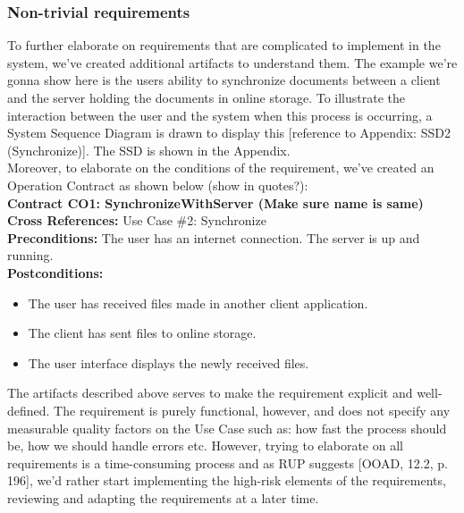 \subsubsection{Non-trivial requirements}
To further elaborate on requirements that are complicated to implement in the system, we’ve created additional artifacts to understand them. The example we’re gonna show here is the users ability to synchronize documents between a client and the server holding the documents in online storage. To illustrate the interaction between the user and the system when this process is occurring, a System Sequence Diagram is drawn to display this [reference to Appendix: SSD2 (Synchronize)]. The SSD is shown in the Appendix.\\
Moreover, to elaborate on the conditions of the requirement, we’ve created an Operation Contract as shown below (show in quotes?):\\
\indent \textbf{Contract CO1: SynchronizeWithServer (Make sure name is same)}\\
\indent \textbf{Cross References:} Use Case \#2: Synchronize\\
\indent \textbf{Preconditions:} The user has an internet connection. The server is up and running.\\
\indent \textbf{Postconditions:}
\begin{itemize}
\item The user has received files made in another client application.
\item The client has sent files to online storage.
\item The user interface displays the newly received files.
\end{itemize}
The artifacts described above serves to make the requirement explicit and well-defined. The requirement is purely functional, however, and does not specify any measurable quality factors on the Use Case such as: how fast the process should be, how we should handle errors etc. However, trying to elaborate on all requirements is a time-consuming process and as RUP suggests [OOAD, 12.2, p. 196], we’d rather start implementing the high-risk elements of the requirements, reviewing and adapting the requirements at a later time. \\
